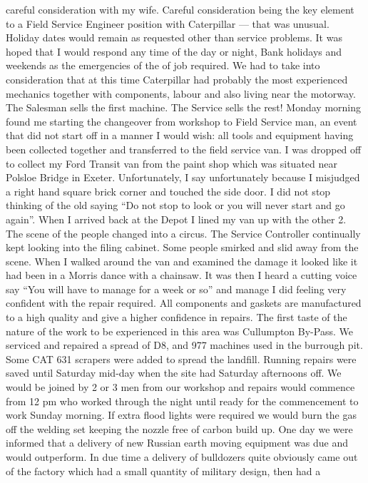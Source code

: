 careful consideration with my wife. Careful consideration being the key
element to a Field Service Engineer position with Caterpillar --- that was
unusual. Holiday dates would remain as requested other than service problems.
It was hoped that I would respond any time of the day or night, Bank holidays
and weekends as the emergencies of the of job required. We had to take into
consideration that at this time Caterpillar had probably the most experienced
mechanics together with components, labour and also living near the motorway.
The Salesman sells the first machine. The Service sells the rest! Monday
morning found me starting the changeover from workshop to Field Service man, an
event that did not start off in a manner I would wish: all tools and equipment
having been collected together and transferred to the field service van. I was
dropped off to collect my Ford Transit van from the paint shop which was
situated near Polsloe Bridge in Exeter. Unfortunately, I say unfortunately
because I misjudged a right hand square brick corner and touched the side door.
I did not stop thinking of the old saying ``Do not stop to look or you will
never start and go again''. When I arrived back at the Depot I lined my van up
with the other 2. The scene of the people changed into a circus. The Service
Controller continually kept looking into the filing cabinet. Some people
smirked and slid away from the scene. When I walked around the van and
examined the damage it looked like it had been in a Morris dance with a
chainsaw. It was then I heard a cutting voice say ``You will have to manage
for a week or so'' and manage I did feeling very confident with the repair
required.  All components and gaskets are manufactured to a high quality and
give a higher confidence in repairs. The first taste of the nature of the work
to be experienced in this area was Cullumpton By-Pass. We serviced and
repaired a spread of D8, and 977 machines used in the burrough       pit.
Some CAT 631 scrapers were added to spread the landfill.  Running repairs were
saved until Saturday mid-day when the site had Saturday afternoons off. We
would be joined by 2 or 3 men from our workshop and repairs would commence from
12 pm who worked through the night until ready for the commencement to work
Sunday morning.  If extra flood lights were required we would burn the gas
off the welding set keeping the nozzle free of carbon build up. One day we
were informed that a delivery of new Russian earth moving equipment was due and
would outperform. In due time a delivery of bulldozers quite obviously came
out of the factory which had a small quantity of military design, then had a
